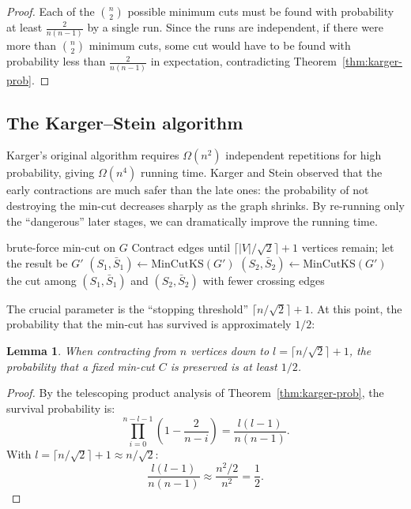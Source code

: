 \documentclass[twoside,12pt]{book}
\theoremstyle{plain}
\newtheorem{lemma}[theorem]{Lemma}
\theoremstyle{definition}
\theoremstyle{remark}
\begin{document}
\begin{proof}
Each of the $\binom{n}{2}$ possible minimum cuts must be found with probability at least $\frac{2}{n(n-1)}$ by a single run. Since the runs are independent, if there were more than $\binom{n}{2}$ minimum cuts, some cut would have to be found with probability less than $\frac{2}{n(n-1)}$ in expectation, contradicting Theorem~\ref{thm:karger-prob}.
\end{proof}

\subsection{The Karger--Stein algorithm}

Karger's original algorithm requires $\Omega(n^2)$ independent repetitions for high probability, giving $\Omega(n^4)$ running time. Karger and Stein observed that the early contractions are much safer than the late ones: the probability of not destroying the min-cut decreases sharply as the graph shrinks. By re-running only the ``dangerous'' later stages, we can dramatically improve the running time.

\begin{algorithm}
\caption{Karger--Stein Recursive Contraction}
\label{alg:karger-stein}
\begin{algorithmic}[1]
        \State \Return brute-force min-cut on $G$
    \EndIf
    \State Contract edges until $\lceil |V| / \sqrt{2} \rceil + 1$ vertices remain; let the result be $G'$
    \State $(S_1, \bar{S}_1) \gets \text{MinCutKS}(G')$ 
    \State $(S_2, \bar{S}_2) \gets \text{MinCutKS}(G')$ 
    \State \Return the cut among $(S_1, \bar{S}_1)$ and $(S_2, \bar{S}_2)$ with fewer crossing edges
\EndFunction
\end{algorithmic}
\end{algorithm}

The crucial parameter is the ``stopping threshold'' $\lceil n / \sqrt{2} \rceil + 1$. At this point, the probability that the min-cut has survived is approximately $1/2$:

\begin{lemma}
\label{lem:ks-half}
When contracting from $n$ vertices down to $l = \lceil n / \sqrt{2} \rceil + 1$, the probability that a fixed min-cut $C$ is preserved is at least $1/2$.
\end{lemma}

\begin{proof}
By the telescoping product analysis of Theorem~\ref{thm:karger-prob}, the survival probability is:
\[
\prod_{i=0}^{n-l-1} \left(1 - \frac{2}{n - i}\right) = \frac{l(l-1)}{n(n-1)}.
\]
With $l = \lceil n/\sqrt{2} \rceil + 1 \approx n/\sqrt{2}$:
\[
\frac{l(l-1)}{n(n-1)} \approx \frac{n^2/2}{n^2} = \frac{1}{2}.
\]
\end{proof}
\end{document}
